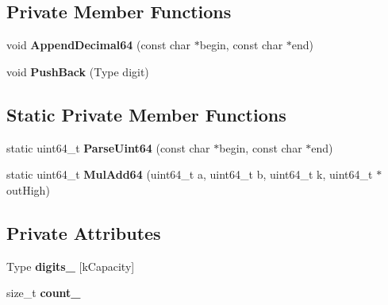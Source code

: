 \subsection*{Private Member Functions}
\begin{DoxyCompactItemize}
\item 
void {\bfseries Append\+Decimal64} (const char $\ast$begin, const char $\ast$end)\hypertarget{classinternal_1_1_big_integer_abd04f535d8f1f443c7551a6845f7749c}{}\label{classinternal_1_1_big_integer_abd04f535d8f1f443c7551a6845f7749c}

\item 
void {\bfseries Push\+Back} (Type digit)\hypertarget{classinternal_1_1_big_integer_a18a4939a983f296085fed6bc5b56d5c1}{}\label{classinternal_1_1_big_integer_a18a4939a983f296085fed6bc5b56d5c1}

\end{DoxyCompactItemize}
\subsection*{Static Private Member Functions}
\begin{DoxyCompactItemize}
\item 
static uint64\+\_\+t {\bfseries Parse\+Uint64} (const char $\ast$begin, const char $\ast$end)\hypertarget{classinternal_1_1_big_integer_a2297a41a749c4cac644f3af85e534e87}{}\label{classinternal_1_1_big_integer_a2297a41a749c4cac644f3af85e534e87}

\item 
static uint64\+\_\+t {\bfseries Mul\+Add64} (uint64\+\_\+t a, uint64\+\_\+t b, uint64\+\_\+t k, uint64\+\_\+t $\ast$out\+High)\hypertarget{classinternal_1_1_big_integer_a3857418321694cd20071203b2f08ebfe}{}\label{classinternal_1_1_big_integer_a3857418321694cd20071203b2f08ebfe}

\end{DoxyCompactItemize}
\subsection*{Private Attributes}
\begin{DoxyCompactItemize}
\item 
Type {\bfseries digits\+\_\+} \mbox{[}k\+Capacity\mbox{]}\hypertarget{classinternal_1_1_big_integer_a0b505df38fedd862a748fe1e629d918a}{}\label{classinternal_1_1_big_integer_a0b505df38fedd862a748fe1e629d918a}

\item 
size\+\_\+t {\bfseries count\+\_\+}\hypertarget{classinternal_1_1_big_integer_ad4bf5198afe86d754ec57a82605e644b}{}\label{classinternal_1_1_big_integer_ad4bf5198afe86d754ec57a82605e644b}

\end{DoxyCompactItemize}
